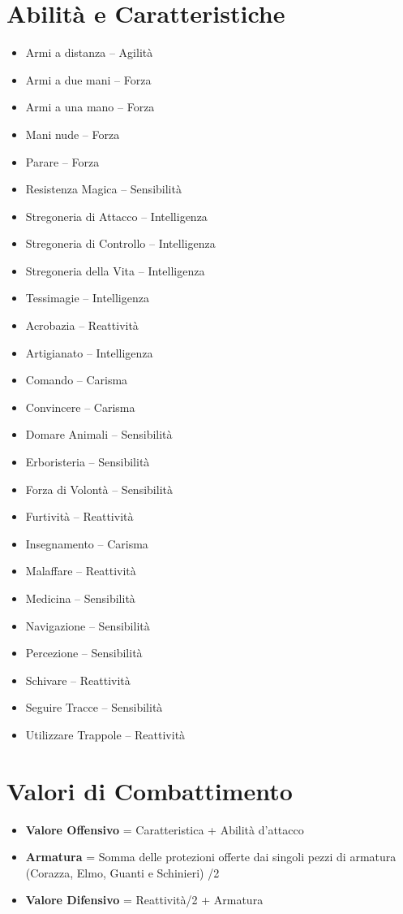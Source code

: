 \documentclass[../manuale_main.tex]{subfiles}
\begin{document}
\section*{Abilit\`a e Caratteristiche}
\begin{multicols}{2}
\begin{itemize}
  \item Armi a distanza -- Agilit\`a
  \item Armi a due mani -- Forza
  \item Armi a una mano -- Forza
  \item Mani nude -- Forza
  \item Parare -- Forza
  \item Resistenza Magica -- Sensibilit\`a
  \item Stregoneria di Attacco -- Intelligenza
  \item Stregoneria di Controllo -- Intelligenza
  \item Stregoneria della Vita -- Intelligenza
  \item Tessimagie -- Intelligenza
  \item Acrobazia -- Reattivit\`a
  \item Artigianato -- Intelligenza
  \item Comando -- Carisma
  \item Convincere -- Carisma
  \item Domare Animali -- Sensibilit\`a
  \item Erboristeria -- Sensibilit\`a
  \item Forza di Volont\`a -- Sensibilit\`a
  \item Furtivit\`a -- Reattivit\`a
  \item Insegnamento -- Carisma
  \item Malaffare -- Reattivit\`a
  \item Medicina -- Sensibilit\`a
  \item Navigazione -- Sensibilit\`a
  \item Percezione -- Sensibilit\`a
  \item Schivare -- Reattivit\`a
  \item Seguire Tracce -- Sensibilit\`a
  \item Utilizzare Trappole -- Reattivit\`a
\end{itemize}
\end{multicols}

\section*{Valori di Combattimento}
\begin{itemize}
  \item \textbf{Valore Offensivo} = Caratteristica + Abilit\`a d'attacco
  \item \textbf{Armatura} = Somma delle protezioni offerte dai singoli pezzi di armatura (Corazza, Elmo, Guanti e Schinieri) /2
  \item \textbf{Valore Difensivo} = Reattivit\`a/2 + Armatura
\end{itemize}
\end{document}
